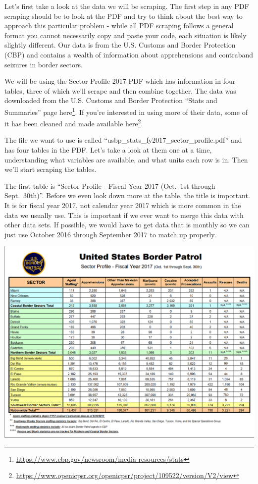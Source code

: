 \documentclass[
]{krantz}
\renewcommand{\href}[2]{#2\footnote{\url{#1}}}
\begin{document}
Let's first take a look at the data we will be scraping. The first step in any PDF scraping should be to look at the PDF and try to think about the best way to approach this particular problem - while all PDF scraping follows a general format you cannot necessarily copy and paste your code, each situation is likely slightly different. Our data is from the U.S. Customs and Border Protection (CBP) and contains a wealth of information about apprehensions and contraband seizures in border sectors.

We will be using the Sector Profile 2017 PDF which has information in four tables, three of which we'll scrape and then combine together. The data was downloaded from the U.S. Customs and Border Protection ``Stats and Summaries'' page \href{https://www.cbp.gov/newsroom/media-resources/stats}{here}. If you're interested in using more of their data, some of it has been cleaned and made available \href{https://www.openicpsr.org/openicpsr/project/109522/version/V2/view}{here}.

The file we want to use is called ``usbp\_stats\_fy2017\_sector\_profile.pdf'' and has four tables in the PDF. Let's take a look at them one at a time, understanding what variables are available, and what units each row is in. Then we'll start scraping the tables.

The first table is ``Sector Profile - Fiscal Year 2017 (Oct.~1st through Sept.~30th)''. Before we even look down more at the table, the title is important. It is for fiscal year 2017, not calendar year 2017 which is more common in the data we usually use. This is important if we ever want to merge this data with other data sets. If possible, we would have to get data that is monthly so we can just use October 2016 through September 2017 to match up properly.

\includegraphics{images/pdf_table_1.PNG}
\end{document}
